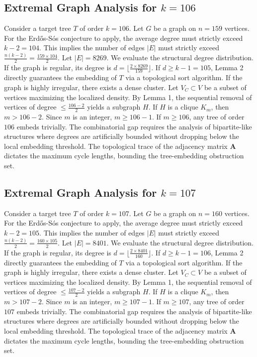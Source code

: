 \documentclass[11pt,a4paper]{article}
\begin{document}
\subsection{Extremal Graph Analysis for $k=106$}
Consider a target tree $T$ of order $k=106$.
Let $G$ be a graph on $n=159$ vertices.
For the Erd\H{o}s-S\'os conjecture to apply, the average degree must strictly exceed $k-2 = 104$.
This implies the number of edges $|E|$ must strictly exceed $\frac{n(k-2)}{2} = \frac{159 \times 104}{2}$.
Let $|E| = 8269$.
We evaluate the structural degree distribution. If the graph is regular, its degree is $d = \lfloor \frac{2 \times 8269}{159} \rfloor$.
If $d \geq k-1 = 105$, Lemma 2 directly guarantees the embedding of $T$ via a topological sort algorithm.
If the graph is highly irregular, there exists a dense cluster. Let $V_C \subset V$ be a subset of vertices maximizing the localized density.
By Lemma 1, the sequential removal of vertices of degree $\leq \frac{106-2}{2}$ yields a subgraph $H$.
If $H$ is a clique $K_{m}$, then $m > 106-2$. Since $m$ is an integer, $m \geq 106-1$. If $m \geq 106$, any tree of order $106$ embeds trivially.
The combinatorial gap requires the analysis of bipartite-like structures where degrees are artificially bounded without dropping below the local embedding threshold. The topological trace of the adjacency matrix $\mathbf{A}$ dictates the maximum cycle lengths, bounding the tree-embedding obstruction set.


\subsection{Extremal Graph Analysis for $k=107$}
Consider a target tree $T$ of order $k=107$.
Let $G$ be a graph on $n=160$ vertices.
For the Erd\H{o}s-S\'os conjecture to apply, the average degree must strictly exceed $k-2 = 105$.
This implies the number of edges $|E|$ must strictly exceed $\frac{n(k-2)}{2} = \frac{160 \times 105}{2}$.
Let $|E| = 8401$.
We evaluate the structural degree distribution. If the graph is regular, its degree is $d = \lfloor \frac{2 \times 8401}{160} \rfloor$.
If $d \geq k-1 = 106$, Lemma 2 directly guarantees the embedding of $T$ via a topological sort algorithm.
If the graph is highly irregular, there exists a dense cluster. Let $V_C \subset V$ be a subset of vertices maximizing the localized density.
By Lemma 1, the sequential removal of vertices of degree $\leq \frac{107-2}{2}$ yields a subgraph $H$.
If $H$ is a clique $K_{m}$, then $m > 107-2$. Since $m$ is an integer, $m \geq 107-1$. If $m \geq 107$, any tree of order $107$ embeds trivially.
The combinatorial gap requires the analysis of bipartite-like structures where degrees are artificially bounded without dropping below the local embedding threshold. The topological trace of the adjacency matrix $\mathbf{A}$ dictates the maximum cycle lengths, bounding the tree-embedding obstruction set.
\end{document}
